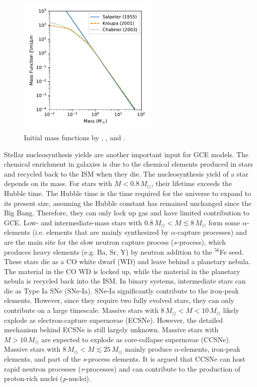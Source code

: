 \documentclass{brandeis-thesis3.2}
\def \msun {M_{\odot}}
\newcommand{\iso}[2]{$^{#1}${#2}}
\begin{document}
\begin{figure}[H]
\centering
\includegraphics[width = 0.6\textwidth]{figs/imf.pdf}
\caption{Initial mass functions by \cite{salpeter55}, \cite{kroupa01}, and \cite{chabrier03}.}
\label{fig:imf}
\end{figure}


Stellar nucleosynthesis yields are another important input for GCE models. The chemical enrichment in galaxies is due to the chemical elements produced in stars and recycled back to the ISM when they die. The nucleosynthesis yield of a star depends on its mass. For stars with $M<0.8\,\msun$, their lifetime exceeds the Hubble time. The Hubble time is the time required for the universe to expand to its present size, assuming the Hubble constant has remained unchanged since the Big Bang. Therefore, they can only lock up gas and have limited contribution to GCE. Low- and intermediate-mass stars with $0.8\,\msun < M \lesssim 8 \, \msun$ form some $\alpha$-elements (i.e. elements that are mainly synthesized by $\alpha$-capture processes) and are the main site for the slow neutron capture process ($s$-process), which produces heavy elements (e.g. Ba, Sr, Y) by neutron addition to the \iso{56}{Fe} seed. These stars die as a CO white dwarf (WD) and leave behind a planetary nebula. The material in the CO WD is locked up, while the material in the planetary nebula is recycled back into the ISM. In binary systems, intermediate stars can die as Type Ia SNe (SNe-Ia). SNe-Ia significantly contribute to the iron-peak elements. However, since they require two fully evolved stars, they can only contribute on a large timescale. Massive stars with $8\,\msun<M<10\,\msun$ likely explode as electron-capture supernovae (ECSNe). However, the detailed mechanism behind ECSNe is still largely unknown. Massive stars with $M>10\,\msun$ are expected to explode as core-collapse supernovae (CCSNe). Massive stars with $8\,\msun<M\lesssim 25\,\msun$ mainly produce $\alpha$-elements, iron-peak elements, and part of the \textit{s}-process elements. It is argued that CCSNe can host rapid neutron processes (\textit{r}-processes) and can contribute to the production of proton-rich nuclei (\textit{p}-nuclei). 
\end{document}
